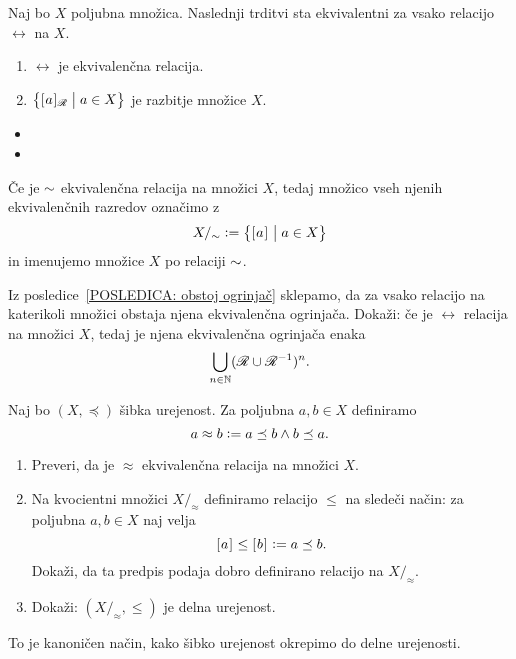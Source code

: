		
		\begin{izrek}
			Naj bo $X$ poljubna množica. Naslednji trditvi sta ekvivalentni za vsako relacijo $\rel$ na $X$.
			\begin{enumerate}
				\item
					$\rel$ je ekvivalenčna relacija.
				\item
					$\set[1]{\ec[\rel]{a}}{a \in X}$ je razbitje množice $X$.
			\end{enumerate}
		\end{izrek}
		
		\begin{dokaz}
			\begin{itemize}
				\item{}
				\item{}
			\end{itemize}
		\end{dokaz}
		
		Če je $\sim$ ekvivalenčna relacija na množici $X$, tedaj množico vseh njenih ekvivalenčnih razredov označimo z
		\[X/_\equ \dfeq \set[1]{\ec{a}}{a \in X}\]
		in imenujemo  množice $X$ po relaciji $\sim$.
		
		
		\begin{vaja}
			Iz posledice~\ref{POSLEDICA: obstoj ogrinjač} sklepamo, da za vsako relacijo na katerikoli množici obstaja njena ekvivalenčna ogrinjača. Dokaži: če je $\rel$ relacija na množici $X$, tedaj je njena ekvivalenčna ogrinjača enaka
			\[\bigcup_{n \in \NN} (\rel \cup \rel^{-1})^n.\]
		\end{vaja}
		
		\begin{vaja}
			Naj bo $(X, \preceq)$ šibka urejenost. Za poljubna $a, b \in X$ definiramo
			\[a \approx b \mathrel{\mathop:}= a \preceq b \land b \preceq a.\]
			\begin{enumerate}
				\item
					Preveri, da je $\approx$ ekvivalenčna relacija na množici $X$.
				\item
					Na kvocientni množici $X/_\approx$ definiramo relacijo $\leq$ na sledeči način: za poljubna $a, b \in X$ naj velja
					\[[\:\!{a}\:\!]_{} \leq [\:\!{b}\:\!]_{} \mathrel{\mathop:}= a \preceq b.\]
					Dokaži, da ta predpis podaja dobro definirano relacijo na $X/_\approx$.
				\item
					Dokaži: $(X/_\approx, \leq)$ je delna urejenost.
			\end{enumerate}
			To je kanoničen način, kako šibko urejenost okrepimo do delne urejenosti.
		\end{vaja}
		

